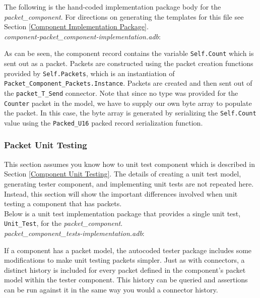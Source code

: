 The following is the hand-coded implementation package body for the \textit{packet\_component}. For directions on generating the templates for this file see Section \ref{Component Implementation Package}. \\

\textit{component-packet\_component-implementation.adb}:

As can be seen, the component record contains the variable \texttt{Self.Count} which is sent out as a packet. Packets are constructed using the packet creation functions provided by \texttt{Self.Packets}, which is an instantiation of \texttt{Packet\_Component\_Packets.Instance}. Packets are created and then sent out of the \texttt{packet\_T\_Send} connector. Note that since no type was provided for the \texttt{Counter} packet in the model, we have to supply our own byte array to populate the packet. In this case, the byte array is generated by serializing the \texttt{Self.Count} value using the \texttt{Packed\_U16} packed record serialization function.

\subsubsection{Packet Unit Testing}

This section assumes you know how to unit test component which is described in Section \ref{Component Unit Testing}. The details of creating a unit test model, generating tester component, and implementing unit tests are not repeated here. Instead, this section will show the important differences involved when unit testing a component that has packets. \\

Below is a unit test implementation package that provides a single unit test, \texttt{Unit\_Test}, for the \textit{packet\_component}. \\

\textit{packet\_component\_tests-implementation.adb}:

If a component has a packet model, the autocoded tester package includes some modifications to make unit testing packets simpler. Just as with connectors, a distinct history is included for every packet defined in the component's packet model within the tester component. This history can be queried and assertions can be run against it in the same way you would a connector history. \\

